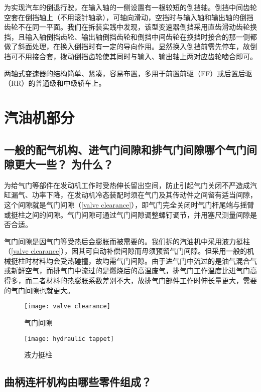 \documentclass[UTF8]{ctexart}
\numberwithin{figure}{section}
\numberwithin{table}{section}
\begin{document}
为实现汽车的倒退行驶，在输入轴的一侧设置有一根较短的倒挡轴。倒挡中间齿轮空套在倒挡轴上（不用滚针轴承），可轴向滑动，空挡时与输入轴和输出轴的倒挡齿轮不在同一平面。我们在拆装实践中发现，该型变速器倒挡采用直齿滑动齿轮换挡，且输入轴倒挡齿轮、输出轴倒挡齿轮和倒挡中间齿轮在换挡时接合的那一侧都做了斜面处理，在换入倒挡时有一定的导向作用。显然换入倒挡前需先停车，故倒挡可不用接合套，拨动倒挡齿轮使其同时与输入、输出轴上两对应齿轮啮合即可。

两轴式变速器的结构简单、紧凑，容易布置，多用于前置前驱（FF）或后置后驱（RR）的普通级和中级轿车上。

\clearpage

\section{汽油机部分}
\subsection{一般的配气机构、进气门间隙和排气门间隙哪个气门间隙更大一些？ 为什么？}

为给气门等部件在发动机工作时受热伸长留出空间，防止引起气门关闭不严造成汽缸漏气、功率下降，在发动机冷态装配时须在气门及其传动件之间留有适当间隙，这个间隙就是气门间隙（\cref{valve clearance}），即气门完全关闭时气门杆尾端与摇臂或挺柱之间的间隙。气门间隙可通过气门间隙调整螺钉调节，并用塞尺测量间隙是否合适。

气门间隙是因气门等受热后会膨胀而被需要的。我们拆的汽油机中采用液力挺柱（\cref{valve clearance}），因其可自动补偿间隙而毋须预留气门间隙。但采用一般的机械挺柱时材料均会受热碰撞，故均需气门间隙。由于进气门中流过的是油气混合气或新鲜空气，而排气门中流过的是燃烧后的高温废气，排气门工作温度比进气门高得多，而二者材料的热膨胀系数差别不大，故排气门部件工作时伸长量更大，需要的气门间隙也就更大。

\begin{figure}[htbp]
	\centering
	\begin{minipage}[b]{0.5\textwidth}
		\centering
		\texttt{[image: valve clearance]}
		\caption{气门间隙}
		\label{valve clearance}
	\end{minipage}
	\begin{minipage}[b]{0.4\textwidth}
		\centering
		\texttt{[image: hydraulic tappet]}
		\caption{液力挺柱}
		\label{hydraulic tappet}
	\end{minipage}
\end{figure}

\subsection{曲柄连杆机构由哪些零件组成？}
\end{document}
